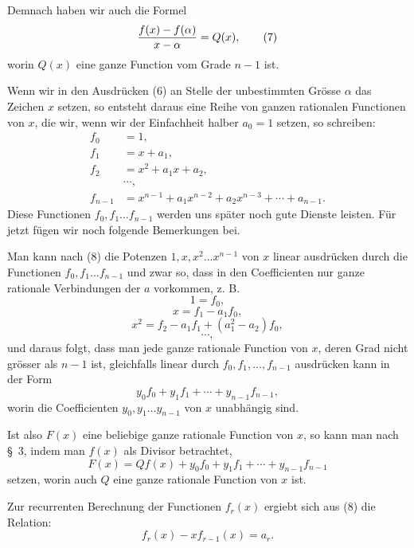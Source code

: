 \documentclass[11pt]{article}
\begin{document}
Demnach haben wir auch die Formel
\begin{equation}
 {f(x)-f(\alpha)\over x-\alpha}=Q(x),
\tag{7}
\end{equation}
worin $Q(x)$ eine ganze Function vom Grade $n-1$ ist.

Wenn wir in den Ausdrücken (6) an Stelle der unbestimmten Grösse $\alpha$ das Zeichen $x$ setzen, so entsteht daraus eine Reihe von ganzen rationalen Functionen von $x$, die wir, wenn wir der Einfachheit halber $a_0=1$ setzen, so schreiben:
\begin{equation}
\begin{aligned}
f_0&=1,\\
f_1&=x+a_1,\\
f_2&=x^2+a_1x+a_2,\\
&\cdots,\\
f_{n-1}&=x^{n-1}+a_1x^{n-2}+a_2x^{n-3}+\cdots+a_{n-1}.
\end{aligned}
\tag{8}
\end{equation}
Diese Functionen $f_0,f_1\ldots f_{n-1}$ werden uns später noch gute Dienste leisten. Für jetzt fügen wir noch folgende Bemerkungen bei.

Man kann nach (8) die Potenzen $1,x,x^2\ldots x^{n-1}$ von $x$ linear ausdrücken durch die Functionen $f_0,f_1\ldots f_{n-1}$ und zwar so, dass in den Coefficienten nur ganze rationale Verbindungen der $a$ vorkommen, z. B.
\[
 1=f_0,
\]
\[
 x=f_1-a_1f_0,
\]
\[
 x^2=f_2-a_1f_1+(a_1^2-a_2)f_0,
\]
\[
 \cdots,
\]
und daraus folgt, dass man jede ganze rationale Function von $x$, deren Grad nicht grösser als $n-1$ ist, gleichfalls linear durch $f_0,f_1,\ldots,f_{n-1}$ ausdrücken kann in der Form
\begin{equation}
 y_0f_0+y_1f_1+\cdots+y_{n-1}f_{n-1},
\tag{9}
\end{equation}
worin die Coefficienten $y_0,y_1\ldots y_{n-1}$ von $x$ unabhängig sind.

Ist also $F(x)$ eine beliebige ganze rationale Function von $x$, so kann man nach \S~3, indem man $f(x)$ als Divisor betrachtet,
\begin{equation}
 F(x)=Qf(x)+y_0f_0+y_1f_1+\cdots+y_{n-1}f_{n-1}
\tag{10}
\end{equation}
setzen, worin auch $Q$ eine ganze rationale Function von $x$ ist.

Zur recurrenten Berechnung der Functionen $f_r(x)$ ergiebt sich aus (8) die Relation:
\begin{equation}
 f_r(x)-xf_{r-1}(x)=a_r.
\tag{11}
\end{equation}
\end{document}
